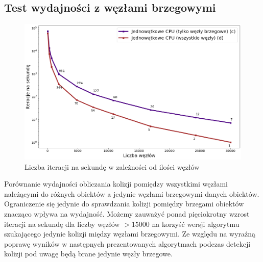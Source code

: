 \documentclass[12pt, letterpaper]{report}
\begin{document}
    \clearpage
    \subsection{Test wydajności z węzłami brzegowymi}
    \begin{figure}[H]
        \centering
        \includegraphics[width=18cm]{performance_cpu_boundary_noboundary.png}
        \caption{
            Liczba iteracji na sekundę w zależności od ilości węzłów
        }
    \end{figure}
    Porównanie wydajności obliczania kolizji pomiędzy wszystkimi węzłami należącymi do różnych obiektów
    a jedynie węzłami brzegowymi danych obiektów. Ograniczenie się jedynie do sprawdzania kolizji pomiędzy
    brzegami obiektów znacząco wpływa na wydajność. Możemy zauważyć ponad pięciokrotny wzrost iteracji
    na sekundę dla liczby węzłów $>15000$ na korzyść wersji algorytmu szukającego jedynie kolizji między 
    węzłami brzegowymi. Ze względu na wyraźną poprawę wyników w następnych prezentowanych algorytmach
    podczas detekcji kolizji pod uwagę będą brane jedynie węzły brzegowe.

\end{document}
